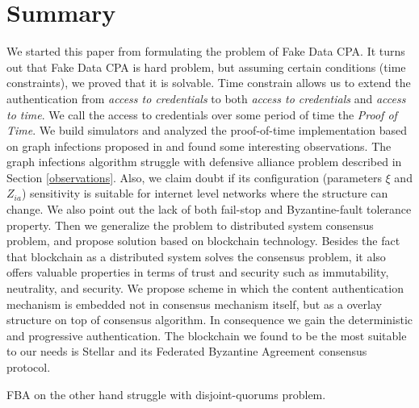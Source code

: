\documentclass[nostrict]{szablonPG}
\begin{document}
\section{Summary}
We started this paper from formulating the problem of Fake Data CPA. It turns out that Fake Data CPA is hard problem, but assuming certain conditions (time constraints), we proved that it is solvable. Time constrain allows us to extend the authentication from \textit{access to credentials} to both \textit{access to credentials} and \textit{access to time}. We call the access to credentials over some period of time the \textit{Proof of Time}. We build simulators and analyzed the proof-of-time implementation based on graph infections proposed in \cite{jekon2019content} and found some interesting observations. The graph infections algorithm struggle with defensive alliance problem described in Section \ref{observations}. Also, we claim doubt if its configuration (parameters $\xi$ and $Z_{ia}$) sensitivity is suitable for internet level networks where the structure can change. We also point out the lack of both fail-stop and Byzantine-fault tolerance property. Then we generalize the problem to distributed system consensus problem, and propose solution based on blockchain technology. Besides the fact that blockchain as a distributed system solves the consensus problem, it also offers valuable properties in terms of trust and security such as immutability, neutrality, and security. We propose scheme in which the content authentication mechanism is embedded not in consensus mechanism itself, but as a overlay structure on top of consensus algorithm. In consequence we gain the deterministic and progressive authentication. The blockchain we found to be the most suitable to our needs is Stellar and its Federated Byzantine Agreement consensus protocol. 

FBA on the other hand struggle with disjoint-quorums problem.



\end{document}
